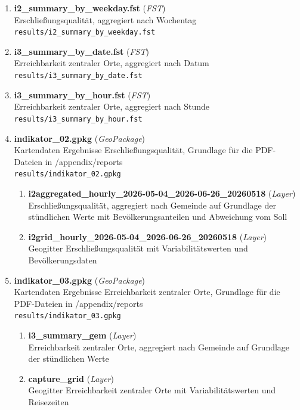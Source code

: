 \begin{enumerate}[label=\arabic*., leftmargin=*, itemsep=0.5em, topsep=0.3em]
\begin{enumerate}[label=\arabic{enumi}.\arabic*, leftmargin=*, itemsep=0.5em, topsep=0.3em]
\texttt{\small results/i2\_summary\_by\_hour.fst}
\item \textbf{i2\_summary\_by\_weekday.fst} \textnormal{(\textit{FST})}\\
Erschließungsqualität, aggregiert nach Wochentag\\
\texttt{\small results/i2\_summary\_by\_weekday.fst}
\item \textbf{i3\_summary\_by\_date.fst} \textnormal{(\textit{FST})}\\
Erreichbarkeit zentraler Orte, aggregiert nach Datum\\
\texttt{\small results/i3\_summary\_by\_date.fst}
\item \textbf{i3\_summary\_by\_hour.fst} \textnormal{(\textit{FST})}\\
Erreichbarkeit zentraler Orte, aggregiert nach Stunde\\
\texttt{\small results/i3\_summary\_by\_hour.fst}
\item \textbf{indikator\_02.gpkg} \textnormal{(\textit{GeoPackage})}\\
Kartendaten Ergebnisse Erschließungsqualität, Grundlage für die PDF-Dateien in /appendix/reports\\
\texttt{\small results/indikator\_02.gpkg}
\begin{enumerate}[label=\arabic{enumi}.\arabic{enumii}.\arabic*, leftmargin=*, itemsep=0.5em, topsep=0.3em]
\item \textbf{i2aggregated\_hourly\_2026-05-04\_2026-06-26\_20260518} \textnormal{(\textit{Layer})}\\
Erschließungsqualität, aggregiert nach Gemeinde auf Grundlage der stündlichen Werte mit Bevölkerungsanteilen und Abweichung vom Soll
\item \textbf{i2grid\_hourly\_2026-05-04\_2026-06-26\_20260518} \textnormal{(\textit{Layer})}\\
Geogitter Erschließungsqualität mit Variabilitätswerten und Bevölkerungsdaten
\end{enumerate}
\item \textbf{indikator\_03.gpkg} \textnormal{(\textit{GeoPackage})}\\
Kartendaten Ergebnisse Erreichbarkeit zentraler Orte, Grundlage für die PDF-Dateien in /appendix/reports\\
\texttt{\small results/indikator\_03.gpkg}
\begin{enumerate}[label=\arabic{enumi}.\arabic{enumii}.\arabic*, leftmargin=*, itemsep=0.5em, topsep=0.3em]
\item \textbf{i3\_summary\_gem} \textnormal{(\textit{Layer})}\\
Erreichbarkeit zentraler Orte, aggregiert nach Gemeinde auf Grundlage der stündlichen Werte
\item \textbf{capture\_grid} \textnormal{(\textit{Layer})}\\
Geogitter Erreichbarkeit zentraler Orte mit Variabilitätswerten und Reisezeiten
\end{enumerate}
\end{enumerate}
\end{enumerate}
